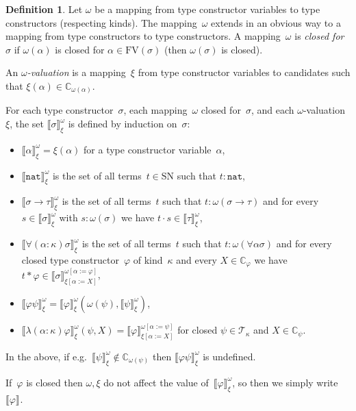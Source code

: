 \documentclass[a4paper,UKenglish,cleveref,autoref,numberwithinsect]{lipics-v2019}
\theoremstyle{definition}
\newtheorem{defn}[theorem]{Definition}
\newcommand{\arrtype}{\rightarrow}
\newcommand{\app}[2]{#1 \cdot #2}
\newcommand{\tapp}[2]{#1 * #2}
\newcommand{\subst}[2]{#1:=#2}
\newcommand{\nat}{\mathtt{nat}}
\newcommand{\FV}{\mathrm{FV}}
\newcommand{\Tc}{\mathcal{T}}
\newcommand{\SN}{\mathrm{SN}}
\newcommand{\Cb}{\mathbb{C}}
\newcommand{\val}[3]{\ensuremath{\llbracket#1\rrbracket_{#2}^{#3}}}
\begin{document}
\begin{defn}\label{def_computability_valuation}
  Let $\omega$ be a mapping from type constructor variables to type
  constructors (respecting kinds). The mapping~$\omega$ extends in an
  obvious way to a mapping from type constructors to type
  constructors. A mapping~$\omega$ is \emph{closed for~$\sigma$} if
  $\omega(\alpha)$ is closed for $\alpha \in \FV(\sigma)$ (then
  $\omega(\sigma)$ is closed).

  An \emph{$\omega$-valuation} is a mapping~$\xi$ from type
  constructor variables to candidates such that $\xi(\alpha) \in
  \Cb_{\omega(\alpha)}$.

  For each type constructor~$\sigma$, each mapping~$\omega$ closed
  for~$\sigma$, and each $\omega$-valuation~$\xi$, the set
  $\val{\sigma}{\xi}{\omega}$ is defined by induction on~$\sigma$:
  \begin{itemize}
  \item $\val{\alpha}{\xi}{\omega} = \xi(\alpha)$ for a type
    constructor variable~$\alpha$,
  \item $\val{\nat}{\xi}{\omega}$ is the set of all terms~$t \in \SN$
    such that $t : \nat$,
  \item $\val{\sigma \arrtype \tau}{\xi}{\omega}$ is the set of all
    terms~$t$ such that $t : \omega(\sigma\arrtype\tau)$ and for
    every~$s \in \val{\sigma}{\xi}{\omega}$ with $s : \omega(\sigma)$
    we have $\app{t}{s} \in \val{\tau}{\xi}{\omega}$,
  \item $\val{\forall(\alpha:\kappa)\sigma}{\xi}{\omega}$ is the set
    of all terms~$t$ such that $t : \omega(\forall\alpha\sigma)$ and
    for every closed type constructor~$\varphi$ of kind~$\kappa$ and
    every $X \in \Cb_\varphi$ we have $\tapp{t}{\varphi} \in
    \val{\sigma}{\xi[\subst{\alpha}{X}]}{\omega[\subst{\alpha}{\varphi}]}$,
  \item
    $\val{\varphi \psi}{\xi}{\omega} =
    \val{\varphi}{\xi}{\omega}(\omega(\psi),\val{\psi}{\xi}{\omega})$,
  \item
    $\val{\lambda(\alpha:\kappa)\varphi}{\xi}{\omega}(\psi,X) =
    \val{\varphi}{\xi[\subst{\alpha}{X}]}{\omega[\subst{\alpha}{\psi}]}$
    for closed $\psi \in \Tc_\kappa$ and $X \in \Cb_\psi$.
  \end{itemize}
  In the above, if e.g.~$\val{\psi}{\xi}{\omega} \notin
  \Cb_{\omega(\psi)}$ then $\val{\varphi \psi}{\xi}{\omega}$ is
  undefined.
\end{defn}

If~$\varphi$ is closed then $\omega,\xi$ do not affect the value
of~$\val{\varphi}{\xi}{\omega}$, so then we simply
write~$\val{\varphi}{}{}$.
\end{document}
